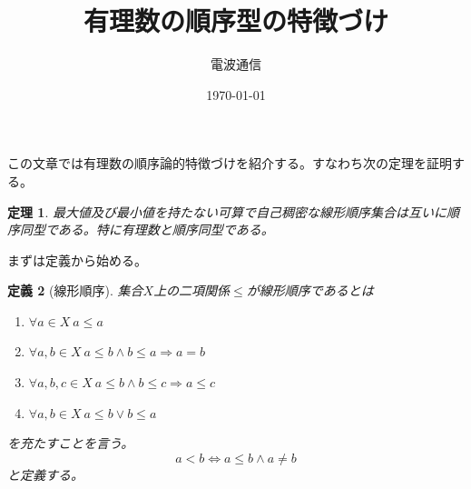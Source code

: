 \documentclass[leqno]{jsarticle}
\title{有理数の順序型の特徴づけ}
\author{電波通信}
\date{\today}
\newtheorem{thm}{定理}
\newtheorem{df}[thm]{定義}
\newcommand{\To}{\Longrightarrow}
\begin{document}
\maketitle


この文章では有理数の順序論的特徴づけを紹介する。すなわち次の定理を証明する。
\begin{thm}\label{thm}
最大値及び最小値を持たない可算で自己稠密な線形順序集合は互いに順序同型である。特に有理数と順序同型である。
\end{thm}
まずは定義から始める。
\begin{df}[線形順序]
集合$X$上の二項関係$\le$が線形順序であるとは
\begin{enumerate}
\item $\forall a\in X\ a\le a$
\item $\forall a, b\in X\ a\le b\land b\le a\To a=b$
\item $\forall a,b,c\in X\ a\le b\land b\le c\To a\le c$
\item $\forall a,b\in X\ a\le b\lor b\le a$
\end{enumerate}
を充たすことを言う。
\[
a<b\iff a\le b \land a\neq b
\]
と定義する。
\end{df}
\end{document}
